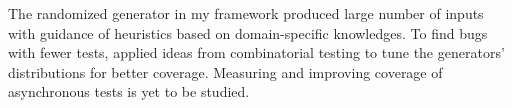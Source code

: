 The randomized generator in my framework produced large number of inputs with
guidance of heuristics based on domain-specific knowledges.  To find bugs with
fewer tests, \citet{judge-cover} applied ideas from combinatorial testing to tune
the generators' distributions for better coverage.  Measuring and improving
coverage of asynchronous tests is yet to be studied.
